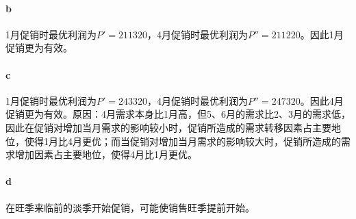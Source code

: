 \documentclass{article}
\begin{document}
    \paragraph*{b} 1月促销时最优利润为$P' = 211320$，4月促销时最优利润为$P'' = 211220$。因此1月促销更为有效。

    \paragraph*{c} 1月促销时最优利润为$P' = 243320$，4月促销时最优利润为$P'' = 247320$。因此4月促销更为有效。原因：4月需求本身比1月高，但5、6月的需求比2、3月的需求低，因此在促销对增加当月需求的影响较小时，促销所造成的需求转移因素占主要地位，使得1月比4月更优；而当促销对增加当月需求的影响较大时，促销所造成的需求增加因素占主要地位，使得4月比1月更优。

    \paragraph*{d} 在旺季来临前的淡季开始促销，可能使销售旺季提前开始。
\end{document}
